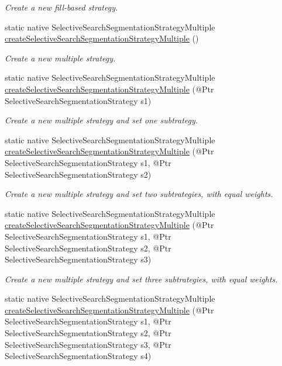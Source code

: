 \begin{DoxyCompactItemize}
\begin{DoxyCompactList}\small\item\em Create a new fill-\/based strategy. \end{DoxyCompactList}\item 
static native Selective\+Search\+Segmentation\+Strategy\+Multiple \hyperlink{group__ximgproc__segmentation_ga54fb05bc5e00a9a79578016f402c3a25}{create\+Selective\+Search\+Segmentation\+Strategy\+Multiple} ()
\begin{DoxyCompactList}\small\item\em Create a new multiple strategy. \end{DoxyCompactList}\item 
static native Selective\+Search\+Segmentation\+Strategy\+Multiple \hyperlink{group__ximgproc__segmentation_ga6efb6138175a12479bd02b85f242afa1}{create\+Selective\+Search\+Segmentation\+Strategy\+Multiple} (@Ptr Selective\+Search\+Segmentation\+Strategy s1)
\begin{DoxyCompactList}\small\item\em Create a new multiple strategy and set one subtrategy. \end{DoxyCompactList}\item 
static native Selective\+Search\+Segmentation\+Strategy\+Multiple \hyperlink{group__ximgproc__segmentation_gaf769336116a86e1107367e971033e25b}{create\+Selective\+Search\+Segmentation\+Strategy\+Multiple} (@Ptr Selective\+Search\+Segmentation\+Strategy s1, @Ptr Selective\+Search\+Segmentation\+Strategy s2)
\begin{DoxyCompactList}\small\item\em Create a new multiple strategy and set two subtrategies, with equal weights. \end{DoxyCompactList}\item 
static native Selective\+Search\+Segmentation\+Strategy\+Multiple \hyperlink{group__ximgproc__segmentation_ga83a457ff4067681d6ea93cf51b584b9d}{create\+Selective\+Search\+Segmentation\+Strategy\+Multiple} (@Ptr Selective\+Search\+Segmentation\+Strategy s1, @Ptr Selective\+Search\+Segmentation\+Strategy s2, @Ptr Selective\+Search\+Segmentation\+Strategy s3)
\begin{DoxyCompactList}\small\item\em Create a new multiple strategy and set three subtrategies, with equal weights. \end{DoxyCompactList}\item 
static native Selective\+Search\+Segmentation\+Strategy\+Multiple \hyperlink{group__ximgproc__segmentation_ga0c5302ec3882ad988a84158bc91186e1}{create\+Selective\+Search\+Segmentation\+Strategy\+Multiple} (@Ptr Selective\+Search\+Segmentation\+Strategy s1, @Ptr Selective\+Search\+Segmentation\+Strategy s2, @Ptr Selective\+Search\+Segmentation\+Strategy s3, @Ptr Selective\+Search\+Segmentation\+Strategy s4)

\end{DoxyCompactItemize}
